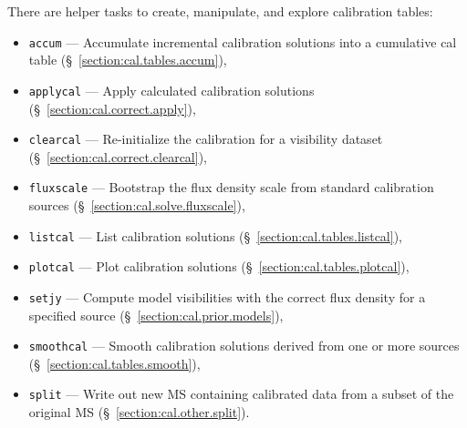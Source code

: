 There are helper tasks to create, manipulate, and explore calibration 
tables:
\begin{itemize}
   \item {\tt accum} --- Accumulate incremental calibration solutions
      into a cumulative cal table (\S~\ref{section:cal.tables.accum}),
   \item {\tt applycal} --- Apply calculated calibration solutions
      (\S~\ref{section:cal.correct.apply}),
   \item {\tt clearcal} --- Re-initialize the calibration for a
     visibility dataset (\S~\ref{section:cal.correct.clearcal}),
   \item {\tt fluxscale} --- Bootstrap the flux density scale from
      standard calibration sources (\S~\ref{section:cal.solve.fluxscale}), 
   \item {\tt listcal} --- List calibration solutions 
      (\S~\ref{section:cal.tables.listcal}),
   \item {\tt plotcal} --- Plot calibration solutions 
      (\S~\ref{section:cal.tables.plotcal}),
    \item {\tt setjy} --- Compute model visibilities with the correct
      flux density for a specified source
      (\S~\ref{section:cal.prior.models}),
   \item {\tt smoothcal} --- Smooth calibration solutions derived from
      one or more sources (\S~\ref{section:cal.tables.smooth}),
   \item {\tt split} --- Write out new MS containing calibrated data
      from a subset of the original MS (\S~\ref{section:cal.other.split}).
\end{itemize}

